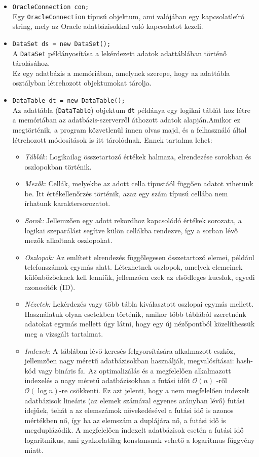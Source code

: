\begin{itemize}

	\item \texttt{OracleConnection con;}
		\\Egy \texttt{OracleConnection} típusú objektum, ami valójában egy kapcsolatleíró string, mely az Oracle adatbázisokkal való kapcsolatot kezeli.

	\item \texttt{DataSet ds = new DataSet();}
		\\A \texttt{DataSet} példányosítása a lekérdezett adatok adattáblában történő tárolásához.
		\\Ez egy adatbázis a memóriában, amelynek szerepe, hogy az adattábla osztályban létrehozott objektumokat tárolja.

	\item \texttt{DataTable dt = new DataTable();}
		\\Az adattábla (\texttt{DataTable}) objektum \texttt{dt} példánya egy logikai táblát hoz létre a memóriában az adatbázis-szerverről áthozott adatok alapján.Amikor ez megtörténik, a program közvetlenül innen olvas majd, és a felhasználó által létrehozott módosítások is itt tárolódnak. Ennek tartalma lehet:
		\begin{itemize}
		\item \textit{Táblák:} Logikailag összetartozó értékek halmaza, elrendezése sorokban és oszlopokban történik.
		\item \textit{Mezők}: Cellák, melyekbe az adott cella típustáól függően adatot vihetünk be. Itt értékellenőrzés történik, azaz egy szám típusú cellába nem írhatunk karaktersorozatot.
		\item \textit{Sorok:} Jellemzően egy adott rekordhoz kapcsolódó értékek sorozata, a logikai szeparálást segítve külön cellákba rendezve, így a sorban lévő mezők alkoltnak oszlopokat.
		\item \textit{Oszlopok:} Az említett elrendezés függőlegesen összetartozó elemei, például telefonszámok egymás alatt. Létezhetnek oszlopok, amelyek elemeinek különbözőeknek kell lenniük, jellemzően ezek az elsődleges kucslok, egyedi azonosítók (ID).
		\item \textit{Nézetek:} Lekérdezés vagy több tábla kiválasztott oszlopai egymás mellett. Használatuk olyan esetekben történik, amikor több táblából szeretnénk adatokat egymás mellett úgy látni, hogy egy új nézőpontból közelíthessük meg a vizsgált tartalmat.
		\item \textit{Indexek:} A táblában lévő keresés felgyorsítására alkalmazott eszköz, jellemzően nagy méretű adatbázisokban használják, megvalósításai: hash-kód vagy bináris fa. Az optimalizálás és a megfelelően alkalmazott indexelés a nagy méretű adatbázisokban a futási időt $\mathcal{O}(n)$ -ről $\mathcal{O}(\log{}n)$-re csökkenti. Ez azt jelenti, hogy a nem megfelelően indexelt adatbázisok lineáris (az elemek számával egyenes arányban lévő) futási idejűek, tehát a az elemszámok növekedésével a futási idő is azonos mértékben nő, így ha az elemszám a duplájára nő, a futási idő is megduplázódik. A megfelelően indexelt adatbázisok esetén a futási idő logaritmikus, ami gyakorlatilag konstansnak vehető a logaritmus függvény miatt.

\end{itemize}
\end{itemize}
